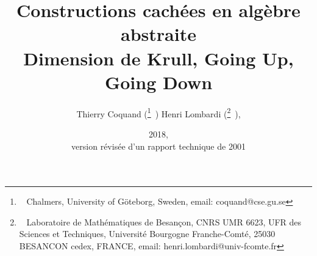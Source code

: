 \newcommand \pst {Positiv\-stellen\-satz\xspace}


\newcommand \cof {cons\-truc\-tif\xspace}
\newcommand \cofs {cons\-truc\-tifs\xspace}

\newcommand \cov {cons\-truc\-ti\-ve\xspace}
\newcommand \covs {cons\-truc\-ti\-ves\xspace}

\newcommand \coma {\maths\covs}
\newcommand \clama {\maths classiques\xspace}

\renewcommand \cot {cons\-truc\-ti\-ve\-ment\xspace}

\newcommand \LLPO{{\bf LLPO}}

\newcommand \maths {mathé\-ma\-tiques\xspace}
\newcommand \mathe {mathé\-ma\-tique\xspace}

\newcommand \prco {démonstration \cov}
\newcommand \prcos {démonstrations \covs}
\newcommand \prcoz {démonstration \covz}
\newcommand \prcosz {démonstration \covsz}

\newcommand \pte {principe du tiers exclu\xspace}

\newcommand \tcg {théo\-rème de compa\-cité\xspace} 
\newcommand \acg {théo\-rème de complé\-tude de Gödel\xspace} 
\newcommand \Tcgi {Le \tcg implique le résultat suivant.\xspace}

\pagestyle{headings}
\RequirePackage{etoolbox}


\title{Constructions cachées en algèbre abstraite \\ 
Dimension de Krull, Going Up, Going Down}
\author{
Thierry Coquand
(\thanks {~
Chalmers, University of Göteborg, Sweden,
email: coquand@cse.gu.se}~)
Henri Lombardi
(\thanks{~
Laboratoire de Mathématiques de Besançon, CNRS UMR 6623, UFR des Sciences et
Techniques,
Université Bourgogne Franche-Comté, 25030 BESANCON cedex, FRANCE,
email: henri.lombardi@univ-fcomte.fr}~),
}
\date{2018, \\version révisée d'un rapport technique de 2001
}
\maketitle






